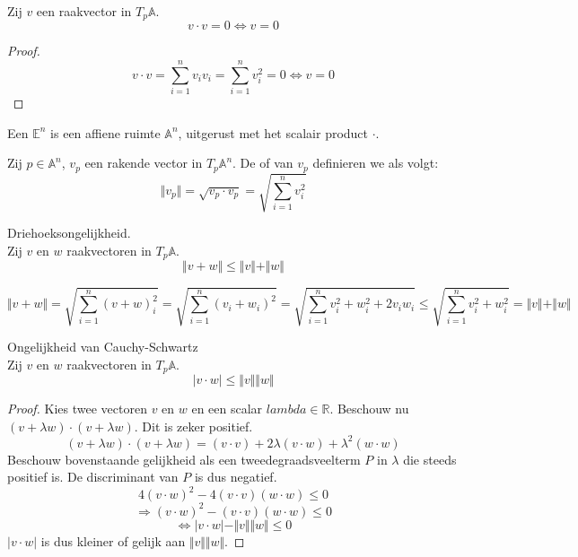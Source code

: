 \documentclass[main.tex]{subfiles}
\begin{document}
\begin{ei}
  Zij $v$ een raakvector in $T_{p}\mathbb{A}$.
  \[ v \cdot v = 0 \Leftrightarrow v = 0 \]

  \begin{proof}
    \[
    v \cdot v =  \sum_{i=1}^{n}v_{i}v_{i} = \sum_{i=1}^{n}v_{i}^{2} = 0 \Leftrightarrow v = 0
    \]
  \end{proof}
\end{ei}

\begin{de}
  Een  $\mathbb{E}^{n}$ is een affiene ruimte $\mathbb{A}^{n}$, uitgerust met het scalair product $\cdot$.
\end{de}

\begin{de}
  Zij $p\in\mathbb{A}^{n}$, $v_{p}$ een rakende vector in $T_{p}\mathbb{A}^{n}$.
  De  of  van $v_{p}$ definieren we als volgt:
  \[ \Vert v_{p} \Vert = \sqrt{v_{p} \cdot v_{p}} = \sqrt{\sum_{i=1}^{n}v_{i}^{2}} \]
\end{de}

\begin{ei}
  Driehoeksongelijkheid.\\
  Zij $v$ en $w$ raakvectoren in $T_{p}\mathbb{A}$.
  \[ \Vert v + w \Vert \le \Vert v \Vert + \Vert w \Vert \]

  \[
  \Vert v + w \Vert
  = \sqrt{\sum_{i=1}^{n}(v+w)_{i}^{2}}
  = \sqrt{\sum_{i=1}^{n}(v_{i}+w_{i})^{2}}
  = \sqrt{\sum_{i=1}^{n}v_{i}^{2}+w_{i}^{2}+ 2v_{i}w_{i}} 
  \le \sqrt{\sum_{i=1}^{n}v_{i}^{2}+w_{i}^{2}} 
  = \Vert v \Vert + \Vert w \Vert
  \]
\end{ei}

\begin{ei}
  \label{ei:ongelijkheid-van-cauchy-schwartz}
  Ongelijkheid van Cauchy-Schwartz\\
  Zij $v$ en $w$ raakvectoren in $T_{p}\mathbb{A}$.
  \[ |v \cdot w| \le \Vert v \Vert \Vert w \Vert \]

  \begin{proof}
    Kies twee vectoren $v$ en $w$ en een scalar $lambda\in \mathbb{R}$.
    Beschouw nu $(v+\lambda w) \cdot (v + \lambda w)$.
    Dit is zeker positief.
    \[ (v+\lambda w) \cdot (v + \lambda w) = (v \cdot v) + 2 \lambda (v \cdot w) + \lambda^{2}(w \cdot w) \]
    Beschouw bovenstaande gelijkheid als een tweedegraadsveelterm $P$ in $\lambda$ die steeds positief is.
    De discriminant van $P$ is dus negatief.
    \[ 4(v \cdot w)^{2} - 4(v \cdot v)(w \cdot w) \le 0 \]
    \[ \Rightarrow  (v \cdot w)^{2} - (v \cdot v)(w \cdot w) \le 0 \]
    \[ \Leftrightarrow |v \cdot w| - \Vert v \Vert \Vert w \Vert \le 0 \]
    $|v \cdot w|$ is dus kleiner of gelijk aan $\Vert v \Vert \Vert w \Vert$.
  \end{proof}
\end{ei}
\end{document}
